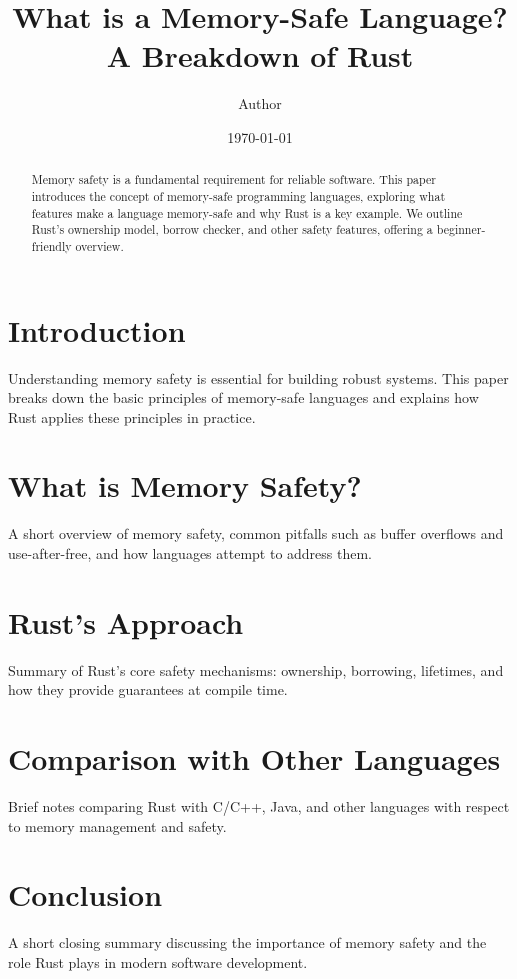 \documentclass{article}
\title{What is a Memory-Safe Language? A Breakdown of Rust}
\author{Author}
\date{\today}
\begin{document}
\maketitle

\begin{abstract}
Memory safety is a fundamental requirement for reliable software. This paper introduces the concept of memory-safe programming languages, exploring what features make a language memory-safe and why Rust is a key example. We outline Rust's ownership model, borrow checker, and other safety features, offering a beginner-friendly overview.
\end{abstract}

\section{Introduction}
\label{sec:introduction}
Understanding memory safety is essential for building robust systems. This paper breaks down the basic principles of memory-safe languages and explains how Rust applies these principles in practice.

\section{What is Memory Safety?}
\label{sec:what-is-memory-safety}
A short overview of memory safety, common pitfalls such as buffer overflows and use-after-free, and how languages attempt to address them.

\section{Rust's Approach}
\label{sec:rust-approach}
Summary of Rust's core safety mechanisms: ownership, borrowing, lifetimes, and how they provide guarantees at compile time.

\section{Comparison with Other Languages}
\label{sec:comparison}
Brief notes comparing Rust with C/C++, Java, and other languages with respect to memory management and safety.

\section{Conclusion}
\label{sec:conclusion}
A short closing summary discussing the importance of memory safety and the role Rust plays in modern software development.
\end{document}
